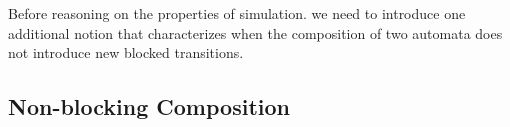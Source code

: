 \documentclass[runningheads]{llncs}
\begin{document}
Before reasoning on the properties of simulation. we need to introduce one additional notion that characterizes when the composition of two automata does not introduce new blocked transitions.

\subsection{Non-blocking Composition}

\end{document}
